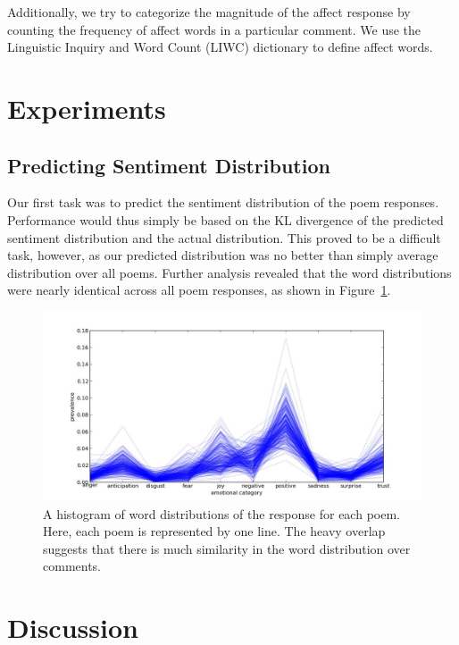 \documentclass[11pt]{article}
\begin{document}
Additionally, we try to categorize the magnitude of the affect response by counting the frequency of affect words in a particular comment. We use the Linguistic Inquiry and Word Count (LIWC) dictionary to define affect words.


\section{Experiments}

\subsection{Predicting Sentiment Distribution}
Our first task was to predict the sentiment distribution of the poem responses. Performance would thus simply be based on the KL divergence of the predicted sentiment distribution and the actual distribution. This proved to be a difficult task, however, as our predicted distribution was no better than simply average distribution over all poems. Further analysis revealed that the word distributions were nearly identical across all poem responses, as shown in Figure~\ref{histogram}.

\begin{figure}[ht]
\begin{center}
\includegraphics[scale=0.4]{../experiments/exp10.jpg}
\end{center}
\caption{A histogram of word distributions of the response for each poem. Here, each poem is represented by one line. The heavy overlap suggests that there is much similarity in the word distribution over comments.}
\label{histogram}
\end{figure}

\section{Discussion}
\end{document}
